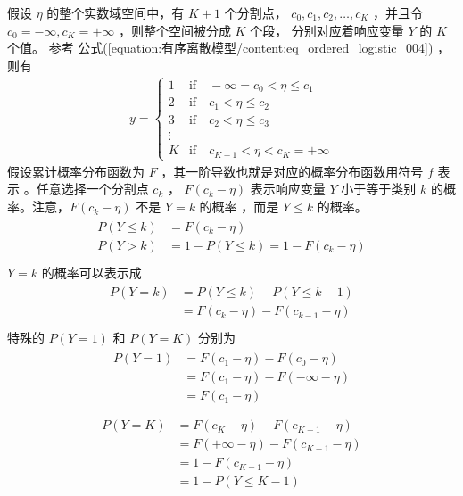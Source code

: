 \documentclass[letterpaper,10pt,english]{sphinxmanual}
\begin{document}
假设 \(\eta\) 的整个实数域空间中，有 \(K+1\) 个分割点，
\({c_0,c_1,c_2,\dots,c_K}\)
，并且令 \(c_0=-\infty,c_{K}=+\infty\)
，则整个空间被分成 \(K\) 个段，
分别对应着响应变量 \(Y\) 的 \(K\) 个值。
参考 公式(\ref{equation:有序离散模型/content:eq_ordered_logistic_004})
，则有
\begin{equation}\label{equation:有序离散模型/content:eq_ordered_logistic_009}
\begin{split}y=
\begin{cases}
1& \text{if}\quad -\infty=c_0 < \eta \le c_1\\
2& \text{if} \quad  c_1< \eta \le c_2 \\
3& \text{if} \quad  c_2< \eta \le c_3 \\
\vdots  \\
K& \text{if} \quad  c_{K-1} < \eta < c_K= +\infty
\end{cases}\end{split}
\end{equation}
假设累计概率分布函数为 \(F\)
，其一阶导数也就是对应的概率分布函数用符号 \(f\) 表示
。任意选择一个分割点 \(c_k\) ，
\(F(c_k - \eta)\) 表示响应变量 \(Y\) 小于等于类别 \(k\)
的概率。注意，\(F(c_k - \eta)\) 不是 \(Y=k\) 的概率
，而是 \(Y \le k\) 的概率。
\begin{align}\label{equation:有序离散模型/content:有序离散模型/content:1}\!\begin{aligned}
P(Y \le k) &= F(c_k - \eta)\\
P(Y > k) &= 1- P(Y \le k) = 1- F(c_k - \eta)\\
\end{aligned}\end{align}
\(Y=k\) 的概率可以表示成
\begin{align}\label{equation:有序离散模型/content:eq_ordered_logistic_010}\!\begin{aligned}
P(Y = k) &= P(Y \le k) - P(Y \le k-1)\\
&= F(c_k - \eta) - F(c_{k-1} - \eta)\\
\end{aligned}\end{align}
特殊的 \(P(Y = 1)\) 和 \(P(Y = K)\) 分别为
\begin{align}\label{equation:有序离散模型/content:有序离散模型/content:2}\!\begin{aligned}
P(Y = 1) &=  F(c_1 - \eta) - F(c_0 - \eta)\\
& =  F(c_1 - \eta) - F(-\infty - \eta)\\
& =  F(c_1 - \eta)\\
\end{aligned}\end{align}\begin{align}\label{equation:有序离散模型/content:有序离散模型/content:3}\!\begin{aligned}
P(Y = K) &=  F(c_K - \eta) - F(c_{K-1} - \eta)\\
& =  F(+\infty - \eta) - F(c_{K-1} - \eta)\\
& = 1 - F(c_{K-1} - \eta)\\
&= 1 - P(Y \le K-1)\\
\end{aligned}\end{align}
\end{document}
